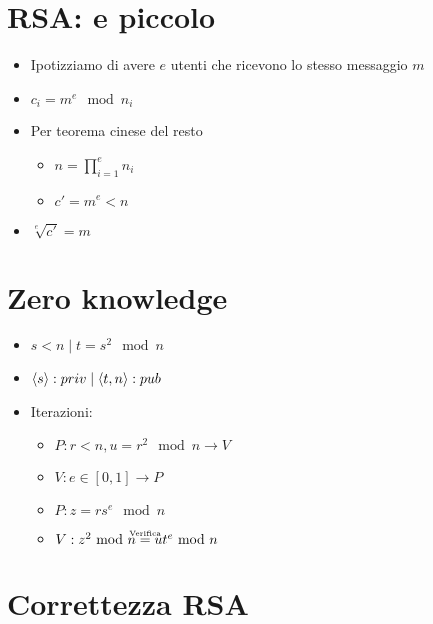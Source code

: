 \section{RSA: e piccolo}

\begin{itemize}
    \item Ipotizziamo di avere $e$ utenti che ricevono lo stesso messaggio $m$
    \item $c_i = m^e \mod{n_i}$
    \item Per teorema cinese del resto
    \begin{itemize}
        \item $n = \prod_{i=1}^{e} n_i$
        \item $c' = m^e < n$
    \end{itemize}
    \item $\sqrt[e]{c'} = m$
\end{itemize}

\section{Zero knowledge}

\begin{itemize}
    \item $s < n \mid t = s^2 \mod{n}$
    \item ${\langle s \rangle}: priv \mid {\langle t, n \rangle}: pub$
    \item Iterazioni:
    \begin{itemize}
        \item $P : r < n, u = r^2 \mod{n} \rightarrow V$
        \item $V : e \in [0, 1] \rightarrow P$
        \item $P : z = rs^e \mod{n}$
        \item $V : z^2 \mod{n} \de{Verifica} ut^e \mod{n}$
    \end{itemize}
\end{itemize}

\section{Correttezza RSA}

